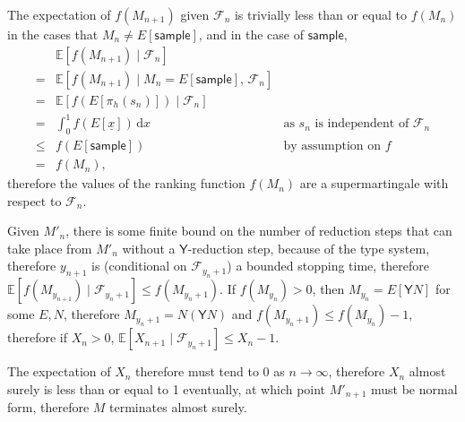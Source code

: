 \documentclass{article}
\newcommand{\Y}{\textsf{Y}}
\newcommand{\sample}{\textsf{sample}}
\begin{document}


The expectation of $f(M_{n+1})$ given $\mathcal{F}_n$ is trivially less than or equal to $f(M_n)$ in the cases that $M_n \neq E[\sample]$, and in the case of $\sample$,
\begin{align*}
& \mathbb{E}[f(M_{n+1}) \mid \mathcal{F}_n] \\
= & \mathbb{E}[f(M_{n+1}) \mid M_n = E[\sample],\, \mathcal{F}_n] \\
= & \mathbb{E}[f(E[\pi_h(s_n)]) \mid \mathcal{F}_n] \\
= & \int_0^1 f(E[\underline x]) \, \mathrm{d} x \qquad & \text{as }s_n\text{ is independent of } \mathcal{F}_n \\
\leq & f(E[\sample]) \qquad & \text{by assumption on } f \\
= & f(M_n),
\end{align*}
therefore the values of the ranking function $f(M_n)$ are a supermartingale with respect to $\mathcal{F}_n$.

Given $M'_n$, there is some finite bound on the number of reduction steps that can take place from $M'_n$ without a $\Y$-reduction step, because of the type system, therefore $y_{n+1}$ is (conditional on $\mathcal{F}_{y_n+1}$) a bounded stopping time, therefore $\mathbb{E}[f(M_{y_{n+1}}) \mid \mathcal{F}_{y_n+1}] \leq f(M_{y_n+1})$. If $f(M_{y_n}) > 0$, then $M_{y_n} = E[\Y N]$ for some $E, N$, therefore $M_{y_n+1} = N (\Y N)$ and $f(M_{y_n+1}) \leq f(M_{y_n}) - 1$, therefore if $X_n > 0$, $\mathbb{E}[X_{n+1} \mid \mathcal{F}_{y_n+1}] \leq X_n - 1$.

The expectation of $X_n$ therefore must tend to 0 as $n \to \infty$, therefore $X_n$ almost surely is less than or equal to 1 eventually, at which point $M'_{n+1}$ must be normal form, therefore $M$ terminates almost surely.


\end{document}
